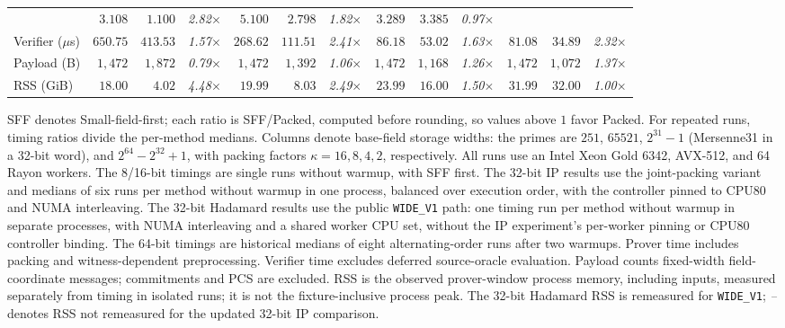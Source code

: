 \begin{table}[!t]
\begin{threeparttable}
\begin{tabular*}{\textwidth}{@{\extracolsep{\fill}}lrrrrrrrrrrrr@{}}
  & $3.108$ & $1.100$ & \textcolor{black!80}{\textit{2.82}\(\times\)}
  & $5.100$ & $2.798$ & \textcolor{black!80}{\textit{1.82}\(\times\)}
  & $3.289$ & $3.385$ & \textcolor{black!80}{\textit{0.97}\(\times\)} \\
Verifier ($\mu$s)
  & $650.75$ & $413.53$ & \textcolor{black!80}{\textit{1.57}\(\times\)}
  & $268.62$ & $111.51$ & \textcolor{black!80}{\textit{2.41}\(\times\)}
  & $86.18$ & $53.02$ & \textcolor{black!80}{\textit{1.63}\(\times\)}
  & $81.08$ & $34.89$ & \textcolor{black!80}{\textit{2.32}\(\times\)} \\
Payload (B)
  & $1{,}472$ & $1{,}872$ & \textcolor{black!80}{\textit{0.79}\(\times\)}
  & $1{,}472$ & $1{,}392$ & \textcolor{black!80}{\textit{1.06}\(\times\)}
  & $1{,}472$ & $1{,}168$ & \textcolor{black!80}{\textit{1.26}\(\times\)}
  & $1{,}472$ & $1{,}072$ & \textcolor{black!80}{\textit{1.37}\(\times\)} \\
RSS (GiB)
  & $18.00$ & $4.02$ & \textcolor{black!80}{\textit{4.48}\(\times\)}
  & $19.99$ & $8.03$ & \textcolor{black!80}{\textit{2.49}\(\times\)}
  & $23.99$ & $16.00$ & \textcolor{black!80}{\textit{1.50}\(\times\)}
  & $31.99$ & $32.00$ & \textcolor{black!80}{\textit{1.00}\(\times\)} \\
\bottomrule
\end{tabular*}
\small
\begin{tablenotes}
\item SFF denotes Small-field-first; each ratio is SFF/Packed, computed
before rounding, so values above \(1\) favor Packed. For repeated runs,
timing ratios divide the per-method medians.
Columns denote base-field storage widths: the primes are \(251\),
\(65521\), \(2^{31}-1\) (Mersenne31 in a 32-bit word), and
\(2^{64}-2^{32}+1\), with packing factors \(\kappa=16,8,4,2\),
respectively.
All runs use an Intel Xeon Gold 6342, AVX-512, and 64 Rayon workers.
The 8/16-bit timings are single runs without warmup, with SFF first.
The 32-bit IP results use the joint-packing variant and medians of six
runs per method without warmup in one process, balanced over execution
order, with the controller pinned to CPU80 and NUMA interleaving.
The 32-bit Hadamard results use the public \texttt{WIDE\_V1} path:
one timing run per method without warmup in separate processes,
with NUMA interleaving and a shared worker CPU set, without the IP
experiment's per-worker pinning or CPU80 controller binding.
The 64-bit timings are historical medians of eight alternating-order
runs after two warmups.
Prover time includes packing and witness-dependent preprocessing.
Verifier time excludes deferred source-oracle evaluation.
Payload counts fixed-width field-coordinate messages; commitments
and PCS are excluded.
RSS is the observed prover-window process memory, including inputs,
measured separately from timing in isolated runs; it is not the
fixture-inclusive process peak. The 32-bit Hadamard RSS is remeasured
for \texttt{WIDE\_V1}; \textit{--} denotes RSS not remeasured for the
updated 32-bit IP comparison.
\end{tablenotes}
\end{threeparttable}
\end{table}
